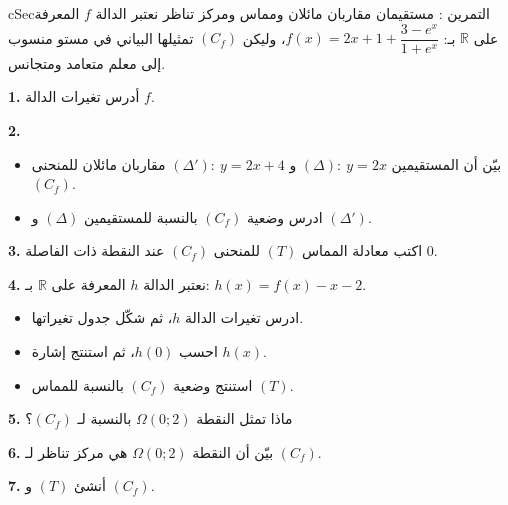 \documentclass[12pt,a4paper]{article}
\newenvironment{BOX}[2]{\begin{otherlanguage}{english}\begin{arbox}{#1}{#2}}{\end{arbox}\end{otherlanguage}}
\newcounter{exo}
\newenvironment{tamrin}[1]{\stepcounter{exo}\begin{BOX}{cSec}{التمرين \theexo: #1}}{\end{BOX}}
\newcommand{\R}{\mathbb{R}}
\newenvironment{sq}{\begin{itemize}[leftmargin=2.4em,itemsep=3pt]}{\end{itemize}}
\newcommand{\qa}{\item[(أ)]}\newcommand{\qb}{\item[(ب)]}\newcommand{\qc}{\item[(جـ)]}\newcommand{\qd}{\item[(د)]}\newcommand{\qe}{\item[(هـ)]}
\newcommand{\QQ}[1]{\par\smallskip\textbf{#1.} }
\begin{document}
\begin{tamrin}{مستقيمان مقاربان مائلان ومماس ومركز تناظر}
نعتبر الدالة $f$ المعرفة على $\R$ بـ: $f(x)=2x+1+\dfrac{3-e^{x}}{1+e^{x}}$، وليكن $(C_f)$ تمثيلها البياني في مستو منسوب إلى معلم متعامد ومتجانس.
\QQ{1} أدرس تغيرات الدالة $f$.
\QQ{2} \begin{sq}
\qa بيّن أن المستقيمين $(\Delta):\ y=2x$ و $(\Delta'):\ y=2x+4$ مقاربان مائلان للمنحنى $(C_f)$.
\qb ادرس وضعية $(C_f)$ بالنسبة للمستقيمين $(\Delta)$ و $(\Delta')$.
\end{sq}
\QQ{3} اكتب معادلة المماس $(T)$ للمنحنى $(C_f)$ عند النقطة ذات الفاصلة $0$.
\QQ{4} نعتبر الدالة $h$ المعرفة على $\R$ بـ: $h(x)=f(x)-x-2$.
\begin{sq}
\qa ادرس تغيرات الدالة $h$، ثم شكّل جدول تغيراتها.
\qb احسب $h(0)$، ثم استنتج إشارة $h(x)$.
\qc استنتج وضعية $(C_f)$ بالنسبة للمماس $(T)$.
\end{sq}
\QQ{5} ماذا تمثل النقطة $\Omega(0;2)$ بالنسبة لـ $(C_f)$؟
\QQ{6} بيّن أن النقطة $\Omega(0;2)$ هي مركز تناظر لـ $(C_f)$.
\QQ{7} أنشئ $(T)$ و $(C_f)$.
\end{tamrin}
\end{document}
